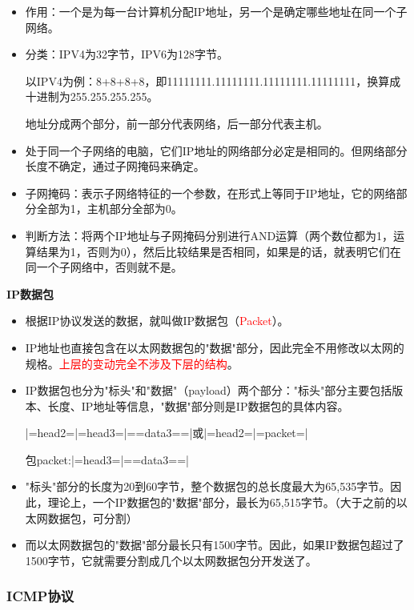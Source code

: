 \documentclass[UTF8]{article}%
\begin{document}
\begin{itemize}
    \item 作用：一个是为每一台计算机分配IP地址，另一个是确定哪些地址在同一个子网络。
    \item 分类：IPV4为32字节，IPV6为128字节。
    
    以IPV4为例：8+8+8+8，即11111111.11111111.11111111.11111111，换算成十进制为255.255.255.255。

    地址分成两个部分，前一部分代表网络，后一部分代表主机。
    \item 处于同一个子网络的电脑，它们IP地址的网络部分必定是相同的。但网络部分长度不确定，通过子网掩码来确定。
    \item 子网掩码：表示子网络特征的一个参数，在形式上等同于IP地址，它的网络部分全部为1，主机部分全部为0。
    \item 判断方法：将两个IP地址与子网掩码分别进行AND运算（两个数位都为1，运算结果为1，否则为0），然后比较结果是否相同，如果是的话，就表明它们在同一个子网络中，否则就不是。
\end{itemize}

\textbf{IP数据包}

\begin{itemize}
    \item 根据IP协议发送的数据，就叫做IP数据包（\textcolor{red}{Packet}）。
    \item IP地址也直接包含在以太网数据包的"数据"部分，因此完全不用修改以太网的规格。\textcolor{red}{上层的变动完全不涉及下层的结构}。
    \item IP数据包也分为"标头"和"数据"（payload）两个部分："标头"部分主要包括版本、长度、IP地址等信息，"数据"部分则是IP数据包的具体内容。
    
    |=head2=|=head3=|==data3==|或|=head2=|=packet=|
    
    包packet:|=head3=|==data3==|

    \item "标头"部分的长度为20到60字节，整个数据包的总长度最大为65,535字节。因此，理论上，一个IP数据包的"数据"部分，最长为65,515字节。（大于之前的以太网数据包，可分割）
    
    \item 而以太网数据包的"数据"部分最长只有1500字节。因此，如果IP数据包超过了1500字节，它就需要分割成几个以太网数据包分开发送了。

\end{itemize}

\subsubsection{ICMP协议}
\end{document}
